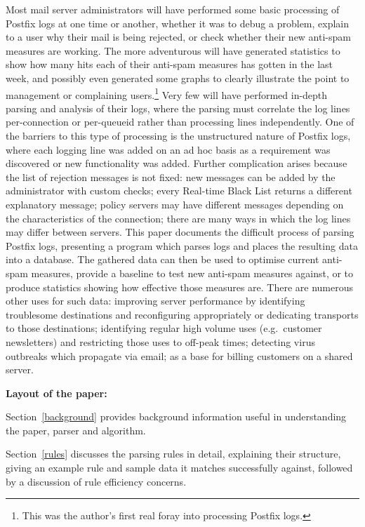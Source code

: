 \documentclass[a4paper,12pt,draft]{article}
\begin{document}
Most mail server administrators will have performed some basic processing
of Postfix logs at one time or another, whether it was to debug a problem,
explain to a user why their mail is being rejected, or check whether their
new anti-spam measures are working.  The more adventurous will have
generated statistics to show how many hits each of their anti-spam measures
has gotten in the last week, and possibly even generated some graphs to
clearly illustrate the point to management or complaining
users.\footnote{This was the author's first real foray into processing
Postfix logs.}  Very few will have performed in-depth parsing and analysis
of their logs, where the parsing must correlate the log lines
per-connection or per-queueid rather than processing lines independently.
One of the barriers to this type of processing is the unstructured nature
of Postfix logs, where each logging line was added on an ad hoc basis as a
requirement was discovered or new functionality was added.  Further
complication arises because the list of rejection messages is not fixed:
new messages can be added by the administrator with custom checks; every
Real-time Black List returns a different explanatory message; policy
servers may have different messages depending on the characteristics of the
connection; there are many ways in which the log lines may differ between
servers.  This paper documents the difficult process of parsing Postfix
logs, presenting a program which parses logs and places the resulting data
into a database.  The gathered data can then be used to optimise current
anti-spam measures, provide a baseline to test new anti-spam measures
against, or to produce statistics showing how effective those measures are.
There are numerous other uses for such data: improving server performance
by identifying troublesome destinations and reconfiguring appropriately or
dedicating transports to those destinations; identifying regular high
volume uses (e.g.\ customer newsletters) and restricting those uses to
off-peak times; detecting virus outbreaks which propagate via email; as a
base for billing customers on a shared server.

\vspace{1em}\noindent\textbf{Layout of the paper:}

Section~\ref{background} provides background information useful in
understanding the paper, parser and algorithm.

Section~\ref{rules} discusses the parsing rules in detail, explaining their
structure, giving an example rule and sample data it matches successfully
against, followed by a discussion of rule efficiency concerns.
\end{document}
